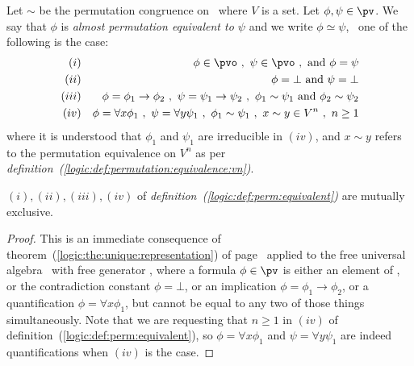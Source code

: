\begin{defin}\label{logic:def:perm:equivalent}
Let $\sim$ be the permutation congruence on \pv\ where $V$ is a set.
Let $\phi,\psi\in\pv$. We say that $\phi$ is {\em almost permutation
equivalent to $\psi$} and we write $\phi\simeq\psi$, \ifand\ one of
the following is the case:
    \begin{eqnarray*}
    (i)&&\phi\in\pvo\ ,\ \psi\in\pvo\ ,\ \mbox{and}\ \phi=\psi\\
    (ii)&&\phi=\bot\ \mbox{and}\ \psi=\bot\\
    (iii)&&\phi=\phi_{1}\to\phi_{2}\ ,\ \psi=\psi_{1}\to\psi_{2}\ ,\
    \phi_{1}\sim\psi_{1}\ \mbox{and}\ \phi_{2}\sim\psi_{2}\\
    (iv)&&\phi=\forall x\phi_{1}\ ,\ \psi=\forall y\psi_{1}\ ,\
    \phi_{1}\sim\psi_{1}\ ,\ x\sim y\in V^{n}\ ,\ n\geq 1
    \end{eqnarray*}
where it is understood that $\phi_{1}$ and $\psi_{1}$ are
irreducible in $(iv)$, and $x\sim y$ refers to the permutation
equivalence on $V^{n}$ as per {\em
definition~(\ref{logic:def:permutation:equivalence:vn})}.
\end{defin}
\begin{prop}
$(i),(ii),(iii),(iv)$ of {\em
definition~(\ref{logic:def:perm:equivalent})} are mutually
exclusive.
\end{prop}
\begin{proof}
This is an immediate consequence of
theorem~(\ref{logic:the:unique:representation}) of
page~\pageref{logic:the:unique:representation} applied to the free
universal algebra \pv\ with free generator \pvo, where a formula
$\phi\in\pv$ is either an element of \pvo, or the contradiction
constant $\phi=\bot$, or an implication $\phi=\phi_{1}\to\phi_{2}$,
or a quantification $\phi=\forall x\phi_{1}$, but cannot be equal to
any two of those things simultaneously. Note that we are requesting
that $n\geq 1$ in $(iv)$ of
definition~(\ref{logic:def:perm:equivalent}), so $\phi=\forall
x\phi_{1}$ and $\psi=\forall y\psi_{1}$ are indeed quantifications
when $(iv)$ is the case.
\end{proof}

